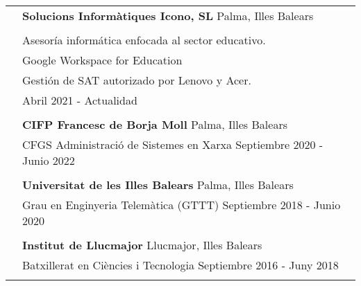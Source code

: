 \documentclass[letterpaper, 11pt]{article}
\begin{document}
\begin{longtable}{p{1.3in}p{4.8in}}




\color{OliveGreen}{Experiencia laboral} 
& \textbf{Solucions Informàtiques Icono, SL} \hfill Palma, Illes Balears \\ 
& \color{OliveGreen}{Funciones:} \\
& Asesoría informática enfocada al sector educativo. \\ 
& Google Workspace for Education \\
& Gestión de SAT autorizado por Lenovo y Acer. \\
& \hfill Abril 2021 - Actualidad \\
& \\


\color{OliveGreen}{Formación} 
& \textbf{CIFP Francesc de Borja Moll} \hfill Palma, Illes Balears \\ 
& CFGS Administració de Sistemes en Xarxa \hfill Septiembre 2020 - Junio 2022 \\
& \\


& \textbf{Universitat de les Illes Balears} \hfill Palma, Illes Balears \\
& Grau en Enginyeria Telemàtica (GTTT) \hfill Septiembre 2018 - Junio 2020\\
& \\

& \textbf{Institut de Llucmajor} \hfill Llucmajor, Illes Balears \\
& Batxillerat en Ciències i Tecnologia \hfill Septiembre 2016 - Juny 2018\\
& \\



\end{longtable}
\end{document}
